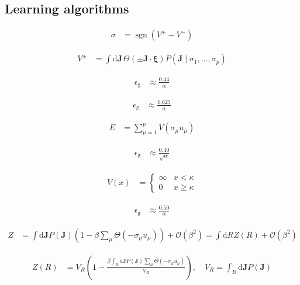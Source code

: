 \documentclass{article}
\begin{document}
\subsection{Learning algorithms}

\begin{align*}
\sigma &= \operatorname{sgn}\left(V^{+} - V^{-}\right) \tag{8.14}
\end{align*}

\begin{align*}
V^{\pm} &= \int \mathrm{d} \boldsymbol{J} \, \Theta\left( \pm \boldsymbol{J} \cdot \boldsymbol{\xi}\right) P\left(\boldsymbol{J} \mid \sigma_{1}, \ldots, \sigma_{p}\right) \tag{8.15}
\end{align*}

\begin{align*}
\epsilon_{\mathrm{g}} &\approx \frac{0.44}{\alpha} \tag{8.16}
\end{align*}

\begin{align*}
\epsilon_{\mathrm{g}} &\approx \frac{0.625}{\alpha} \tag{8.17}
\end{align*}

\begin{align*}
E &= \sum_{\mu=1}^{p} V\left(\sigma_{\mu} u_{\mu}\right) \tag{8.18}
\end{align*}

\begin{align*}
\epsilon_{\mathrm{g}} &\approx \frac{0.40}{\sqrt{\alpha}} \tag{8.19}
\end{align*}

\begin{align*}
V(x) &= \begin{cases}
\infty & x < \kappa \\
0 & x \geq \kappa
\end{cases} \tag{8.20}
\end{align*}

\begin{align*}
\epsilon_{\mathrm{g}} &\approx \frac{0.50}{\alpha} \tag{8.21}
\end{align*}

\begin{align*}
Z &= \int \mathrm{d} \boldsymbol{J} P(\boldsymbol{J})\left(1 - \beta \sum_{\mu} \Theta\left(-\sigma_{\mu} u_{\mu}\right)\right) + \mathcal{O}\left(\beta^{2}\right) = \int \mathrm{d} R Z(R) + \mathcal{O}\left(\beta^{2}\right) \tag{8.22}
\end{align*}

\begin{align*}
Z(R) &= V_{R}\left(1 - \frac{\beta \int_{R} \mathrm{d} \boldsymbol{J} P(\boldsymbol{J}) \sum_{\mu} \Theta\left(-\sigma_{\mu} u_{\mu}\right)}{V_{R}}\right), \quad V_{R} = \int_{R} \mathrm{d} \boldsymbol{J} P(\boldsymbol{J}) \tag{8.23}
\end{align*}
\end{document}
